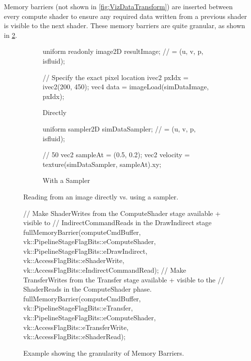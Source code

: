Memory barriers (not shown in \cref{fig:VizDataTransform}) are inserted between every compute shader to ensure any required data written from a previous shader is visible to the next shader\cite{TheKhronosGroupVulkanSpec}. %
These memory barriers are quite granular, as shown in \cref{fig:VizMemoryBarrier}.

\begin{figure}
    \centering
     \begin{subfigure}[b]{0.49\textwidth}
         \centering
\begin{glslcode}
uniform readonly image2D resultImage;
 // = (u, v, p, isfluid);

// Specify the exact pixel location
ivec2 pxIdx = ivec2(200, 450);
vec4 data = imageLoad(simDataImage, pxIdx);
\end{glslcode}
\caption{Directly}
     \end{subfigure}
     \hfill
     \begin{subfigure}[b]{0.49\textwidth}
         \centering
\begin{glslcode}
uniform sampler2D simDataSampler;
 // = (u, v, p, isfluid);
 
// 50%
vec2 sampleAt = (0.5, 0.2);
vec2 velocity = texture(simDataSampler, sampleAt).xy;
\end{glslcode}
\caption{With a Sampler}
     \end{subfigure}
  \caption{Reading from an image directly vs. using a sampler.}
    \label{fig:VizImageRead}
\end{figure}
\begin{figure}
    \centering
    \begin{cppcode}
// Make ShaderWrites from the ComputeShader stage available + visible to 
//      IndirectCommandReads in the DrawIndirect stage
fullMemoryBarrier(computeCmdBuffer,
    vk::PipelineStageFlagBits::eComputeShader, vk::PipelineStageFlagBits::eDrawIndirect,
    vk::AccessFlagBits::eShaderWrite, vk::AccessFlagBits::eIndirectCommandRead);
// Make TransferWrites from the Transfer stage available + visible to the
//      ShaderReads in the ComputeShader phase.
fullMemoryBarrier(computeCmdBuffer,
    vk::PipelineStageFlagBits::eTransfer, vk::PipelineStageFlagBits::eComputeShader,
    vk::AccessFlagBits::eTransferWrite, vk::AccessFlagBits::eShaderRead);
    \end{cppcode}
    \caption{Example showing the granularity of Memory Barriers.}
    \label{fig:VizMemoryBarrier}
\end{figure}

